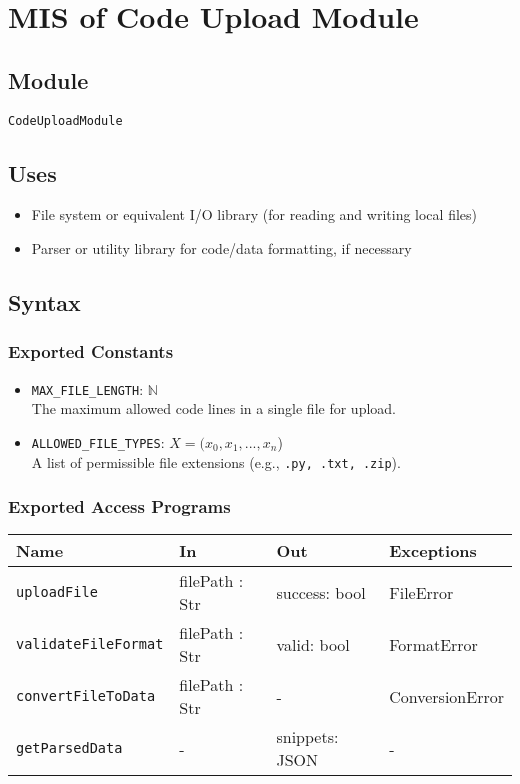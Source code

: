 \documentclass[12pt, titlepage]{article}
\begin{document}
\section{MIS of Code Upload Module} \label{mCodeUpload}

\subsection{Module} %

\texttt{CodeUploadModule} 

\subsection{Uses}

\begin{itemize}
    \item File system or equivalent I/O library (for reading and writing local files)
    \item Parser or utility library for code/data formatting, if necessary
\end{itemize}

\subsection{Syntax}

\subsubsection{Exported Constants}

\begin{itemize}
    \item \texttt{MAX\_FILE\_LENGTH}: $\mathbb{N}$ \\ 
    The maximum allowed code lines in a single file for upload.
    \item \texttt{ALLOWED\_FILE\_TYPES}: $X = (x_0, x_1, ... , x_n$) \\ 
    A list of permissible file extensions (e.g., \texttt{.py, .txt, .zip}).
\end{itemize}

\subsubsection{Exported Access Programs}

\begin{center}
\begin{tabular}{p{5cm} p{3.5cm} p{3.5cm} p{2cm}}
\hline
\textbf{Name} & \textbf{In} & \textbf{Out} & \textbf{Exceptions} \\
\hline
\texttt{uploadFile} & filePath : Str & success: bool & FileError \\
\texttt{validateFileFormat} & filePath : Str & valid: bool & FormatError \\
\texttt{convertFileToData} & filePath : Str & - & ConversionError \\
\texttt{getParsedData} & - & snippets: JSON & -\\
\hline
\end{tabular}
\end{center}
\end{document}
